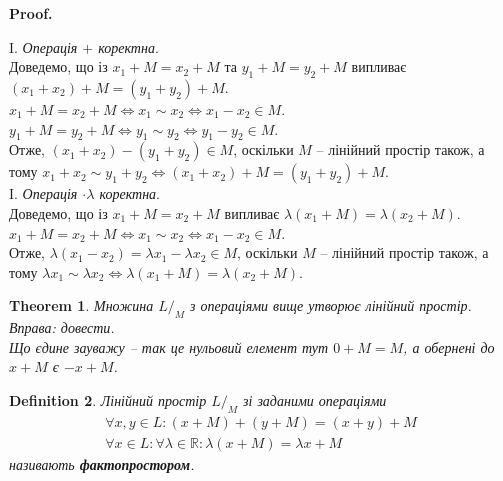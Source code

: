 \documentclass[a4paper, 10pt]{article}
\makeatletter
\theoremstyle{theoremdd}
\newtheorem{theorem}{Theorem}[subsection]
\newtheorem{definition}[theorem]{Definition}
\renewenvironment{proof}[1][Proof.\\]{\par
\pushQED{\hfill \qed}%
\normalfont \topsep6\p@\@plus6\p@\relax
\trivlist
\item\relax
{\bfseries
#1\@addpunct{.}}\hspace\labelsep\ignorespaces
}{%
\popQED\endtrivlist\@endpefalse
}
\makeatother
\begin{document}
	\begin{proof}
	I. \textit{Операція $+$ коректна}.\\
	Доведемо, що із $x_1+M=x_2+M$ та $y_1+M=y_2+M$ випливає $(x_1+x_2)+M=(y_1+y_2)+M$.\\
	$x_1+M=x_2+M \iff x_1 \sim x_2 \iff x_1 - x_2 \in M$.\\
	$y_1+M=y_2+M \iff y_1 \sim y_2 \iff y_1 - y_2 \in M$.\\
	Отже, $(x_1+x_2)-(y_1+y_2) \in M$, оскільки $M$ -- лінійний простір також, а тому $x_1+x_2 \sim y_1+y_2 \iff (x_1+x_2)+M=(y_1+y_2)+M$.
	\bigskip \\
	I. \textit{Операція $\cdot \lambda$ коректна}.\\
	Доведемо, що із $x_1+M=x_2+M$ випливає $\lambda(x_1+M) = \lambda(x_2+M)$.\\
	$x_1+M=x_2+M \iff x_1 \sim x_2 \iff x_1 - x_2 \in M$.\\
	Отже, $\lambda(x_1-x_2) = \lambda x_1 - \lambda x_2 \in M$, оскільки $M$ -- лінійний простір також, а тому $\lambda x_1 \sim \lambda x_2 \iff \lambda(x_1+M) = \lambda(x_2+M)$.
	\end{proof}
	
	\begin{theorem}
	Множина $L/_{M}$ з операціями вище утворює лінійний простір.\\
	\textit{Вправа: довести.}
	\bigskip \\
	Що єдине зауважу -- так це нульовий елемент тут $0+M=M$, а обернені до $x+M$ є $-x+M$.
	\end{theorem}
		
	\begin{definition}
	Лінійний простір $L/_{M}$ зі заданими операціями
	\begin{align*}
	\forall x,y \in L: (x+M) + (y+M) = (x+y) + M \\
	\forall x \in L: \forall \lambda \in \mathbb{R}: \lambda( x+M) = \lambda x + M
	\end{align*}
	називають \textbf{фактопростором}.
	\end{definition}
	
\end{document}
